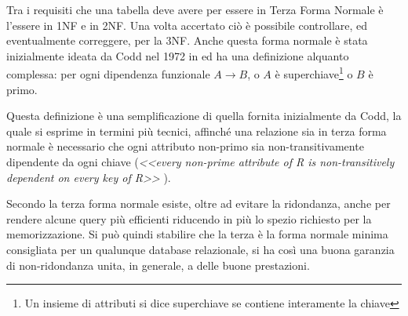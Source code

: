 Tra i requisiti che una tabella deve avere per essere in Terza Forma Normale è l'essere in 1NF e in 2NF. Una volta accertato ciò è possibile controllare, ed eventualmente correggere, per la 3NF. Anche questa forma normale è stata inizialmente ideata da Codd nel 1972 in \cite{codd:relationalmodel} ed ha una definizione alquanto complessa: per ogni dipendenza funzionale $A \rightarrow B$, o $A$ è superchiave\footnote{Un insieme di attributi si dice superchiave se contiene interamente la chiave} o $B$ è primo. 

Questa definizione è una semplificazione di quella fornita inizialmente da Codd, la quale si esprime in termini più tecnici, affinché una relazione sia in terza forma normale è necessario che ogni attributo non-primo sia non-transitivamente dipendente da ogni chiave (\emph{<<every non-prime attribute of R is non-transitively dependent on every key of R>>} \cite{codd:relationalmodel}).

Secondo \textcite{techopedia} la terza forma normale esiste, oltre ad evitare la ridondanza, anche per rendere alcune query più efficienti riducendo in più lo spezio richiesto per la memorizzazione. Si può quindi stabilire che la terza è la forma normale minima consigliata per un qualunque database relazionale, si ha così una buona garanzia di non-ridondanza unita, in generale, a delle buone prestazioni.